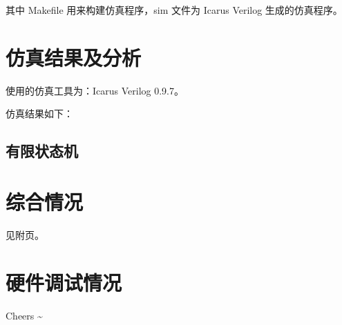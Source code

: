 \documentclass[11pt,a4paper]{article}
\begin{document}
其中 Makefile 用来构建仿真程序，sim 文件为 Icarus Verilog 生成的仿真程序。


\section{仿真结果及分析}
使用的仿真工具为：Icarus Verilog 0.9.7。

仿真结果如下：

\subsection{有限状态机}

\section{综合情况}
见附页。

\section{硬件调试情况}

Cheers \textasciitilde


\end{document}
